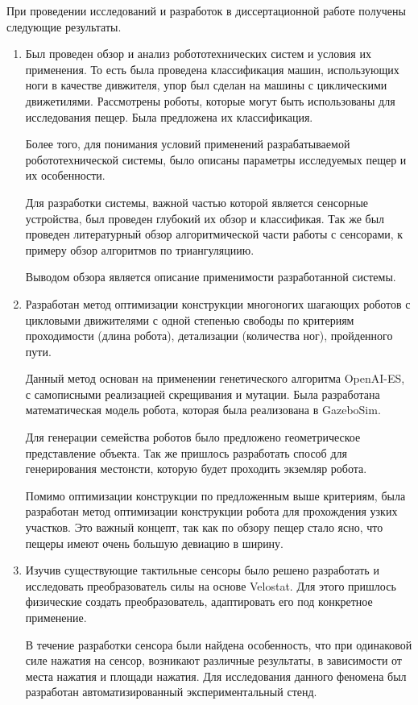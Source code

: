 При  проведении  исследований  и  разработок  в  диссертационной  работе  получены 
следующие результаты.
\begin{enumerate}
  \item Был проведен обзор и анализ робототехнических систем и условия их применения. То есть была проведена классификация машин, использующих ноги в качестве дивжителя, упор был сделан на машины с циклическими движетилями. Рассмотрены роботы, которые могут быть использованы для исследования пещер. Была предложена их классификация.

  Более того, для понимания условий применений разрабатываемой робототехнической системы, было описаны параметры исследуемых пещер и их особенности.

  Для разработки системы, важной частью которой является сенсорные устройства, был проведен глубокий их обзор и классификая. Так же был проведен литературный обзор алгоритмической части работы с сенсорами, к примеру обзор алгоритмов по триангуляциию.

  Выводом обзора является описание применимости разработанной системы.
  \item Разработан метод оптимизации конструкции многоногих шагающих роботов с цикловыми движителями с одной степенью свободы по критериям проходимости (длина робота), детализации (количества ног), пройденного пути.

  Данный метод основан на применении генетического алгоритма OpenAI-ES, с самописными реализацией скрещивания и мутации. Была разработана математическая модель робота, которая была реализована в GazeboSim. 
  
  Для генерации семейства роботов было предложено геометрическое представление объекта. Так же пришлось разработать способ для генерирования местонсти, которую будет проходить экземляр робота.

  Помимо оптимизации конструкции по предложенным выше критериям, была разработан метод оптимизации конструкции робота для прохождения узких участков. Это важный концепт, так как по обзору пещер стало ясно, что пещеры имеют очень большую девиацию в ширину.
  \item Изучив существующие тактильные сенсоры было решено разработать и исследовать преобразователь силы на основе Velostat. Для этого пришлось физические создать преобразователь, адаптировать его под конкретное применение.

  В течение разработки сенсора были найдена особенность, что при одинаковой силе нажатия на сенсор, возникают различные результаты, в зависимости от места нажатия и площади нажатия. Для исследования данного феномена был разработан автоматизированный экспериментальный стенд. 
  

\end{enumerate}

